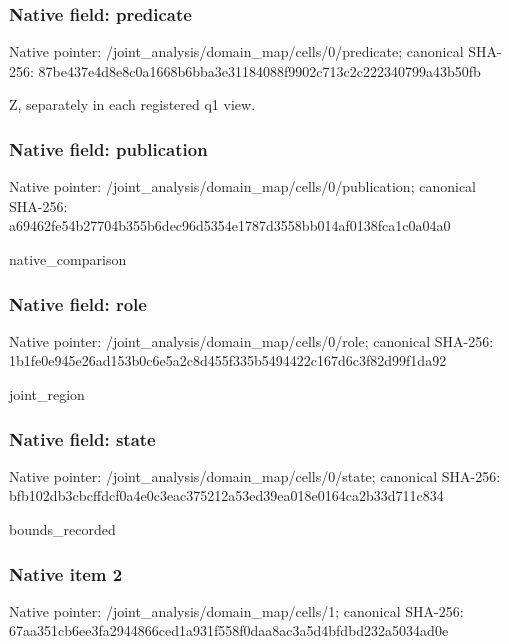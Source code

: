 \documentclass[10pt,a4paper]{article}
\begin{document}
\subsubsection{Native field: predicate}


Native pointer: /joint\_analysis/domain\_m\allowbreak{}ap/cells/0/predicate; canonical SHA-256: 87be437e4d8e8c0a1668b6bb\allowbreak{}a3e31184088f9902c713c2c2\allowbreak{}22340799a43b50fb


Z, separately in each registered q1 view.


\subsubsection{Native field: publication}


Native pointer: /joint\_analysis/domain\_m\allowbreak{}ap/cells/0/publication; canonical SHA-256: a69462fe54b27704b355b6de\allowbreak{}c96d5354e1787d3558bb014a\allowbreak{}f0138fca1c0a04a0


native\_comparison


\subsubsection{Native field: role}


Native pointer: /joint\_analysis/domain\_map/cells/0/role; canonical SHA-256: 1b1fe0e945e26ad153b0c6e5\allowbreak{}a2c8d455f335b5494422c167\allowbreak{}d6c3f82d99f1da92


joint\_region


\subsubsection{Native field: state}


Native pointer: /joint\_analysis/domain\_m\allowbreak{}ap/cells/0/state; canonical SHA-256: bfb102db3cbcffdcf0a4e0c3\allowbreak{}eac375212a53ed39ea018e01\allowbreak{}64ca2b33d711c834


bounds\_recorded


\subsubsection{Native item 2}


Native pointer: /joint\_analysis/domain\_map/cells/1; canonical SHA-256: 67aa351cb6ee3fa2944866ce\allowbreak{}d1a931f558f0daa8ac3a5d4b\allowbreak{}fdbd232a5034ad0e
\end{document}
